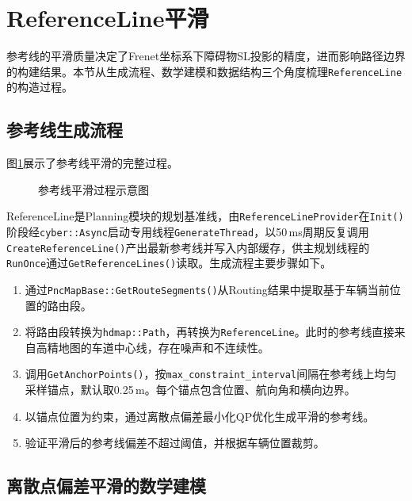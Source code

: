 \section{ReferenceLine平滑}

参考线的平滑质量决定了Frenet坐标系下障碍物SL投影的精度，进而影响路径边界的构建结果。本节从生成流程、数学建模和数据结构三个角度梳理\texttt{ReferenceLine}的构造过程。

\subsection{参考线生成流程}

图\ref{fig:ref_smooth}展示了参考线平滑的完整过程。

\begin{figure}[htbp]
\centering
{}
\caption{参考线平滑过程示意图}
\label{fig:ref_smooth}
\end{figure}

ReferenceLine是Planning模块的规划基准线，由\texttt{ReferenceLineProvider}在\texttt{Init()}阶段经\texttt{cyber::Async}启动专用线程\texttt{GenerateThread}，以50\,ms周期反复调用\texttt{CreateReferenceLine()}产出最新参考线并写入内部缓存，供主规划线程的\texttt{RunOnce}通过\texttt{GetReferenceLines()}读取。生成流程主要步骤如下。

\begin{enumerate}
\item 通过\texttt{PncMapBase::GetRouteSegments()}从Routing结果中提取基于车辆当前位置的路由段。

\item 将路由段转换为\texttt{hdmap::Path}，再转换为\texttt{ReferenceLine}。此时的参考线直接来自高精地图的车道中心线，存在噪声和不连续性。

\item 调用\texttt{GetAnchorPoints()}，按\texttt{max\_constraint\_interval}间隔在参考线上均匀采样锚点，默认取0.25\,m。每个锚点包含位置、航向角和横向边界。

\item 以锚点位置为约束，通过离散点偏差最小化QP优化生成平滑的参考线。

\item 验证平滑后的参考线偏差不超过阈值，并根据车辆位置裁剪。
\end{enumerate}

\subsection{离散点偏差平滑的数学建模}

